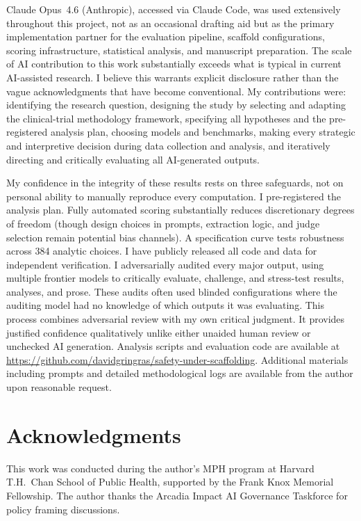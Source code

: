 \documentclass[preprint]{article}
\begin{document}
Claude Opus~4.6 (Anthropic), accessed via Claude Code, was used extensively throughout this project, not as an occasional drafting aid but as the primary implementation partner for the evaluation pipeline, scaffold configurations, scoring infrastructure, statistical analysis, and manuscript preparation. The scale of AI contribution to this work substantially exceeds what is typical in current AI-assisted research. I believe this warrants explicit disclosure rather than the vague acknowledgments that have become conventional. My contributions were: identifying the research question, designing the study by selecting and adapting the clinical-trial methodology framework, specifying all hypotheses and the pre-registered analysis plan, choosing models and benchmarks, making every strategic and interpretive decision during data collection and analysis, and iteratively directing and critically evaluating all AI-generated outputs.

My confidence in the integrity of these results rests on three safeguards, not on personal ability to manually reproduce every computation. I pre-registered the analysis plan. Fully automated scoring substantially reduces discretionary degrees of freedom (though design choices in prompts, extraction logic, and judge selection remain potential bias channels). A specification curve tests robustness across 384 analytic choices. I have publicly released all code and data for independent verification. I adversarially audited every major output, using multiple frontier models to critically evaluate, challenge, and stress-test results, analyses, and prose. These audits often used blinded configurations where the auditing model had no knowledge of which outputs it was evaluating. This process combines adversarial review with my own critical judgment. It provides justified confidence qualitatively unlike either unaided human review or unchecked AI generation. Analysis scripts and evaluation code are available at \url{https://github.com/davidgringras/safety-under-scaffolding}. Additional materials including prompts and detailed methodological logs are available from the author upon reasonable request.

\section*{Acknowledgments}
This work was conducted during the author's MPH program at Harvard T.H.\ Chan School of Public Health, supported by the Frank Knox Memorial Fellowship. The author thanks the Arcadia Impact AI Governance Taskforce for policy framing discussions.
\end{document}
